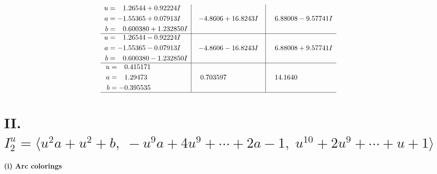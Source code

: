 \documentclass[1p]{elsarticle_modified}
\theoremstyle{definition}
\begin{document}
$$\begin{array}{c|c|c}
\begin{aligned}
u &= \phantom{-}1.26544 + 0.92224 I \\
a &= -1.55365 + 0.07913 I \\
b &= \phantom{-}0.600380 + 1.232850 I\end{aligned}
 & -4.8606 + 16.8243 I & \phantom{-}6.88008 - 9.57741 I \\ \hline\begin{aligned}
u &= \phantom{-}1.26544 - 0.92224 I \\
a &= -1.55365 - 0.07913 I \\
b &= \phantom{-}0.600380 - 1.232850 I\end{aligned}
 & -4.8606 - 16.8243 I & \phantom{-}6.88008 + 9.57741 I \\ \hline\begin{aligned}
u &= \phantom{-}0.415171\phantom{ +0.000000I} \\
a &= \phantom{-}1.29473\phantom{ +0.000000I} \\
b &= -0.395535\phantom{ +0.000000I}\end{aligned}
 & \phantom{-}0.703597\phantom{ +0.000000I} & \phantom{-}14.1640\phantom{ +0.000000I}\\
 \hline 
 \end{array}$$\newpage\newpage\renewcommand{\arraystretch}{1}
\centering \section*{II. $I^u_{2}= \langle u^2 a+u^2+b,\;- u^9 a+4 u^9+\cdots+2 a-1,\;u^{10}+2 u^9+\cdots+u+1 \rangle$}
\flushleft \textbf{(i) Arc colorings}\\
\end{document}
